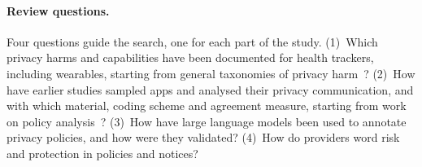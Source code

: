 \paragraph{Review questions.} Four questions guide the search, one for each part
of the study. (1)~Which privacy harms and capabilities have been documented for
health trackers, including wearables, starting from
general taxonomies of privacy harm~\parencite{solove2006taxonomy,calo2011boundaries}?
(2)~How have earlier studies sampled apps and analysed their privacy
communication, and with which material, coding scheme and agreement measure,
starting from work on policy analysis~\parencite{wilson2016creation,zimmeck2019maps}?
(3)~How have large language
models been used to annotate privacy policies, and how were they validated?
(4)~How do providers word risk and protection in policies and notices?

